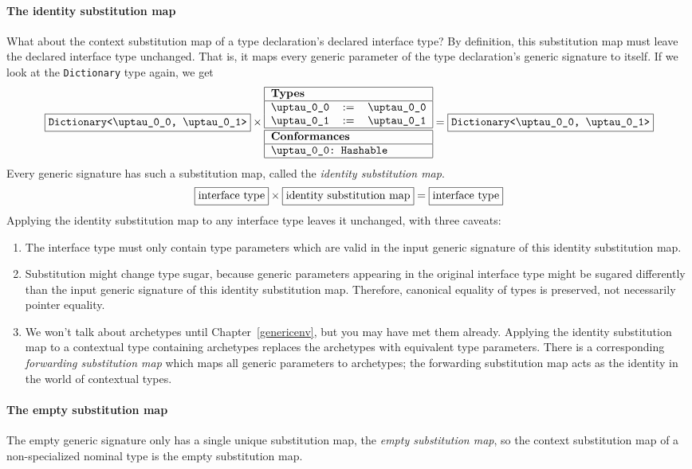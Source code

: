 \documentclass[a4paper,headsepline,bibliography=totoc,toc=flat,fleqn,twoside=semi]{scrbook}
\theoremstyle{definition}
\theoremstyle{definition}
\theoremstyle{definition}
\newcommand{\mathboxed}[1]{\boxed{\mbox{\vphantom{pI\texttt{pI}}#1}}}
\newcommand{\ttbox}[1]{\boxed{\mbox{\vphantom{pI\texttt{pI}}\texttt{#1}}}}
\newcommand{\ttgp}[2]{\texttt{$\uptau$\_#1\_#2}}
\newcommand{\SubMapC}[2]{\begin{tabular}{|lll|}
\hline
\multicolumn{3}{|l|}{\textbf{Types}}\\
\hline
#1\\
\hline
\hline
\multicolumn{3}{|l|}{\textbf{Conformances}}\\
\hline
#2\\
\hline
\end{tabular}}
\newcommand{\SubType}[2]{\texttt{#1}&$:=$&\texttt{#2}}
\newcommand{\SubConf}[1]{\multicolumn{3}{|l|}{\texttt{#1}}}
\begin{document}
\paragraph{The identity substitution map}
What about the context substitution map of a type declaration's declared interface type? By definition, this substitution map must leave the declared interface type unchanged. That is, it maps every generic parameter of the type declaration's generic signature to itself. If we look at the \texttt{Dictionary} type again, we get
\[
\ttbox{Dictionary<\ttgp{0}{0}, \ttgp{0}{1}>}\times
\SubMapC{
\SubType{\ttgp{0}{0}}{\ttgp{0}{0}}\\
\SubType{\ttgp{0}{1}}{\ttgp{0}{1}}
}{
\SubConf{\ttgp{0}{0}:\ Hashable}
} = \ttbox{Dictionary<\ttgp{0}{0}, \ttgp{0}{1}>}
\]
Every generic signature has such a substitution map, called the \emph{identity substitution map}.
\[\mathboxed{interface type} \times \mathboxed{identity substitution map} = \mathboxed{interface type}\]
Applying the identity substitution map to any interface type leaves it unchanged, with three caveats:
\begin{enumerate}
\item The interface type must only contain type parameters which are valid in the input generic signature of this identity substitution map.
\item Substitution might change type sugar, because generic parameters appearing in the original interface type might be sugared differently than the input generic signature of this identity substitution map. Therefore, canonical equality of types is preserved, not necessarily pointer equality.
\item We won't talk about archetypes until Chapter~\ref{genericenv}, but you may have met them already. Applying the identity substitution map to a contextual type containing archetypes replaces the archetypes with equivalent type parameters. There is a corresponding \emph{forwarding substitution map} which maps all generic parameters to archetypes; the forwarding substitution map acts as the identity in the world of contextual types.
\end{enumerate}

\paragraph{The empty substitution map}
The empty generic signature only has a single unique substitution map, the \emph{empty substitution map}, so the context substitution map of a non-specialized nominal type is the empty substitution map.
\end{document}
